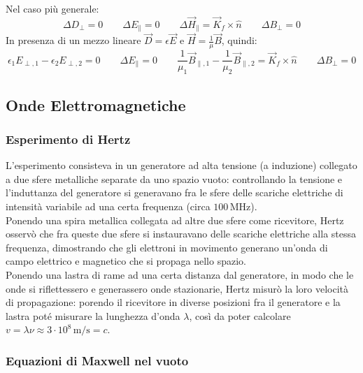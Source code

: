 \documentclass[]{article}
\begin{document}
Nel caso più generale:
\begin{equation}
	\Delta D_{\perp} = 0 \qquad \Delta E_{\parallel} = 0 \qquad \Delta\vec{H}_{\parallel} = \vec{K}_f \times \hat{n} \qquad \Delta B_{\perp} = 0 
	\label{eq:7}
\end{equation}
In presenza di un mezzo lineare $ \vec{D} = \epsilon\vec{E} $ e $ \vec{H} = \frac{1}{\mu}\vec{B} $, quindi:
\begin{equation}
	\epsilon_1 E_{\perp,1} - \epsilon_2 E_{\perp,2} = 0 \qquad \Delta E_{\parallel} = 0 \qquad \frac{1}{\mu_1}\vec{B}_{\parallel,1} - \frac{1}{\mu_2}\vec{B}_{\parallel,2} = \vec{K}_f \times \hat{n} \qquad \Delta B_{\perp} = 0 
	\label{eq:8}
\end{equation}

\subsection{Onde Elettromagnetiche}

\subsubsection{Esperimento di Hertz}

L'esperimento consisteva in un generatore ad alta tensione (a induzione) collegato a due sfere metalliche separate da uno spazio vuoto: controllando la tensione e l'induttanza del generatore si generavano fra le sfere delle scariche elettriche di intensità variabile ad una certa frequenza (circa $ 100\,\text{MHz} $). \\ 
%
Ponendo una spira metallica collegata ad altre due sfere come ricevitore, Hertz osservò che fra queste due sfere si instauravano delle scariche elettriche alla stessa frequenza, dimostrando che gli elettroni in movimento generano un'onda di campo elettrico e magnetico che si propaga nello spazio. \\ 
%
Ponendo una lastra di rame ad una certa distanza dal generatore, in modo che le onde si riflettessero e generassero onde stazionarie, Hertz misurò la loro velocità di propagazione: porendo il ricevitore in diverse posizioni fra il generatore e la lastra poté misurare la lunghezza d'onda $ \lambda $, così da poter calcolare $ v = \lambda\nu \approx 3\cdot 10^8 \,\text{m/s} = c $.

\subsubsection{Equazioni di Maxwell nel vuoto}
\end{document}
